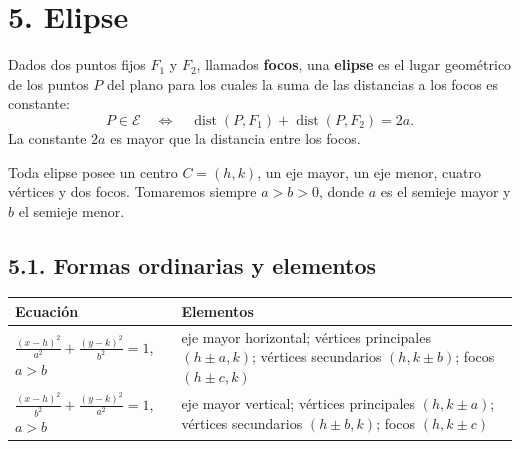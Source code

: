 \documentclass[11pt]{article}
\begin{document}
\begin{center}
\end{center}

\section*{5. Elipse}

\begin{mdframed}[style=teoSty,frametitle={Definición de elipse}]
Dados dos puntos fijos $F_1$ y $F_2$, llamados \textbf{focos}, una \textbf{elipse} es el lugar geométrico de los puntos $P$ del plano para los cuales la suma de las distancias a los focos es constante:
\[
P\in\mathcal E
\quad\Longleftrightarrow\quad
\operatorname{dist}(P,F_1)+\operatorname{dist}(P,F_2)=2a.
\]
La constante $2a$ es mayor que la distancia entre los focos.
\end{mdframed}

Toda elipse posee un centro $C=(h,k)$, un eje mayor, un eje menor, cuatro vértices y dos focos. Tomaremos siempre $a>b>0$, donde $a$ es el semieje mayor y $b$ el semieje menor.

\subsection*{5.1. Formas ordinarias y elementos}

\begin{center}
\renewcommand{\arraystretch}{1.55}
\begin{tabular}{m{64mm}|m{84mm}}
\toprule
Ecuación & Elementos \\
\midrule
$\displaystyle \frac{(x-h)^2}{a^2}+\frac{(y-k)^2}{b^2}=1$, $a>b$
& eje mayor horizontal; vértices principales $(h\pm a,k)$; vértices secundarios $(h,k\pm b)$; focos $(h\pm c,k)$ \\
\midrule
$\displaystyle \frac{(x-h)^2}{b^2}+\frac{(y-k)^2}{a^2}=1$, $a>b$
& eje mayor vertical; vértices principales $(h,k\pm a)$; vértices secundarios $(h\pm b,k)$; focos $(h,k\pm c)$ \\
\bottomrule
\end{tabular}
\end{center}
\end{document}
